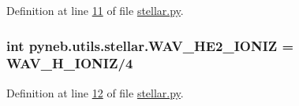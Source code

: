 Definition at line \hyperlink{stellar_8py_source_l00011}{11} of file \hyperlink{stellar_8py_source}{stellar.\+py}.

\hypertarget{namespacepyneb_1_1utils_1_1stellar_a1b0844f39c08a2b7289ad093042cf55e}{}
\subsubsection[{W\+A\+V\+\_\+\+H\+E2\+\_\+\+I\+O\+N\+I\+Z}]{\setlength{\rightskip}{0pt plus 5cm}int pyneb.\+utils.\+stellar.\+W\+A\+V\+\_\+\+H\+E2\+\_\+\+I\+O\+N\+I\+Z = {\bf W\+A\+V\+\_\+\+H\+\_\+\+I\+O\+N\+I\+Z}/4}\label{namespacepyneb_1_1utils_1_1stellar_a1b0844f39c08a2b7289ad093042cf55e}


Definition at line \hyperlink{stellar_8py_source_l00012}{12} of file \hyperlink{stellar_8py_source}{stellar.\+py}.

